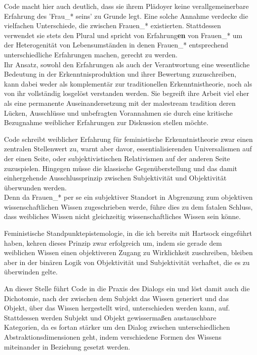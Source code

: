Code macht hier auch deutlich, dass sie ihrem Plädoyer keine verallgemeinerbare
Erfahrung des 'Frau\_* seins' zu Grunde legt. Eine solche Annahme verdecke die
vielfachen Unterschiede, die zwischen Frauen\_* existierten. Stattdessen
verwendet sie stets den Plural und spricht von Erfahrung\textbf{en} von Frauen\_* um der
Heterogenität von Lebensumständen in denen Frauen\_* entsprechend
unterschiedliche Erfahrungen machen, gerecht zu werden.
\\

Ihr Ansatz, sowohl den Erfahrungen als auch der Verantwortung eine wesentliche
Bedeutung in der Erkenntnisproduktion und ihrer Bewertung zuzuschreiben, kann
dabei weder als komplementär zur traditionellen Erkenntnistheorie, noch als von
ihr vollständig losgelöst verstanden werden. Sie begreift ihre Arbeit viel eher
als eine permanente Auseinandersetzung mit der malestream tradition deren
Lücken, Ausschlüsse und unbefragten Vorannahmen sie durch eine kritische
Bezugnahme weiblicher Erfahrungen zur Diskussion stellen möchte.\footnotemark
{}

Code schreibt weiblicher Erfahrung für feministische Erkenntnistheorie zwar
einen zentralen Stellenwert zu, warnt aber davor, essentialisierenden
Universalismen auf der einen Seite, oder subjektivistischen Relativismen auf der
anderen Seite zuzuspielen. Hingegen müsse die klassische Gegenüberstellung und
das damit einhergehende Ausschlussprinzip zwischen Subjektivität und
Objektivität überwunden werden.\\
 Denn da Frauen\_* per se ein subjektiver
Standort in Abgrenzung zum objektiven wissenschaftlichen Wissen zugeschrieben
werde, führe dies zu dem fatalen Schluss, dass weibliches Wissen nicht
gleichzeitig wissenschaftliches Wissen sein könne.\footnotemark
{} 

Feministische Standpunktepistemologie, in die ich bereits mit Hartsock eingeführt haben, kehren dieses Prinzip zwar erfolgreich um, indem sie gerade dem weiblichen Wissen einen objektiveren Zugang zu Wirklichkeit zuschreiben, bleiben aber in der binären Logik von Objektivität und Subjektivität verhaftet, die es zu überwinden gelte.

An dieser Stelle führt Code in die Praxis des Dialogs ein und löst damit auch die Dichotomie, nach der zwischen dem Subjekt das Wissen generiert und das Objekt, über das Wissen hergestellt wird, unterschieden werden kann, auf.
Stattdessen werden Subjekt und Objekt gewissermaßen austauschbare Kategorien, da
es fortan stärker um den Dialog zwischen unterschiedlichen
Abstraktionsdimensionen geht, indem verschiedene Formen des Wissens miteinander
in Beziehung gesetzt werden.\footnotemark {} 

